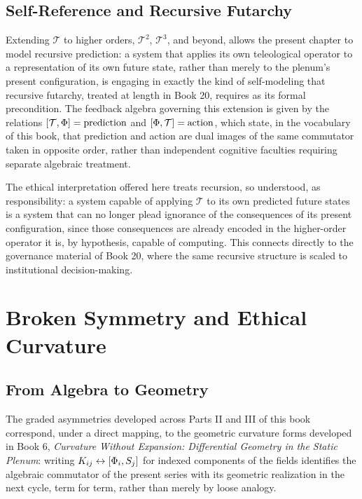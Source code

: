 \chapter{Self-Reference and Recursive Futarchy}

Extending $\mathcal{T}$ to higher orders, $\mathcal{T}^2$, $\mathcal{T}^3$, and beyond, allows the present chapter to model recursive prediction: a system that applies its own teleological operator to a representation of its own future state, rather than merely to the plenum's present configuration, is engaging in exactly the kind of self-modeling that recursive futarchy, treated at length in Book 20, requires as its formal precondition. The feedback algebra governing this extension is given by the relations $[\mathcal{T}, \Phi] = \text{prediction}$ and $[\Phi, \mathcal{T}] = \text{action}$, which state, in the vocabulary of this book, that prediction and action are dual images of the same commutator taken in opposite order, rather than independent cognitive faculties requiring separate algebraic treatment.

The ethical interpretation offered here treats recursion, so understood, as responsibility: a system capable of applying $\mathcal{T}$ to its own predicted future states is a system that can no longer plead ignorance of the consequences of its present configuration, since those consequences are already encoded in the higher-order operator it is, by hypothesis, capable of computing. This connects directly to the governance material of Book 20, where the same recursive structure is scaled to institutional decision-making.

\part{Broken Symmetry and Ethical Curvature}

\chapter{From Algebra to Geometry}

The graded asymmetries developed across Parts II and III of this book correspond, under a direct mapping, to the geometric curvature forms developed in Book 6, \emph{Curvature Without Expansion: Differential Geometry in the Static Plenum}: writing $K_{ij} \leftrightarrow [\Phi_i, S_j]$ for indexed components of the fields identifies the algebraic commutator of the present series with its geometric realization in the next cycle, term for term, rather than merely by loose analogy.


